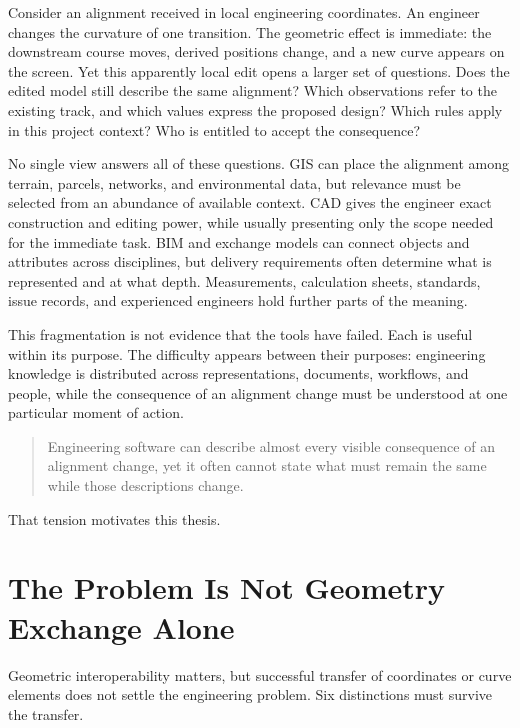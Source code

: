 Consider an alignment received in local engineering coordinates. An engineer
changes the curvature of one transition. The geometric effect is immediate:
the downstream course moves, derived positions change, and a new curve appears
on the screen. Yet this apparently local edit opens a larger set of questions.
Does the edited model still describe the same alignment? Which observations
refer to the existing track, and which values express the proposed design?
Which rules apply in this project context? Who is entitled to accept the
consequence?

No single view answers all of these questions. GIS can place the alignment
among terrain, parcels, networks, and environmental data, but relevance must be
selected from an abundance of available context. CAD gives the engineer exact
construction and editing power, while usually presenting only the scope needed
for the immediate task. BIM and exchange models can connect objects and
attributes across disciplines, but delivery requirements often determine what
is represented and at what depth. Measurements, calculation sheets, standards,
issue records, and experienced engineers hold further parts of the meaning.

This fragmentation is not evidence that the tools have failed. Each is useful
within its purpose. The difficulty appears between their purposes: engineering
knowledge is distributed across representations, documents, workflows, and
people, while the consequence of an alignment change must be understood at one
particular moment of action.

\begin{quote}
Engineering software can describe almost every visible consequence of an
alignment change, yet it often cannot state what must remain the same while
those descriptions change.
\end{quote}

That tension motivates this thesis.

\section{The Problem Is Not Geometry Exchange Alone}

Geometric interoperability matters, but successful transfer of coordinates or
curve elements does not settle the engineering problem. Six distinctions must
survive the transfer.

